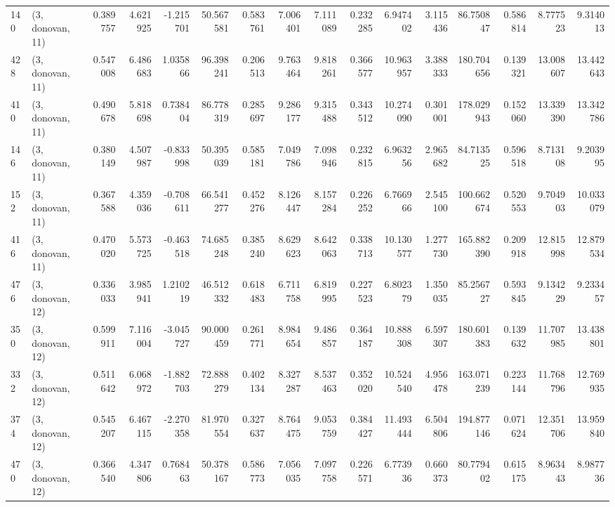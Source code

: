 \begin{tabular}{llrrrrrrrrrrrrrr}
140 &  (3, donovan, 11) &   0.389757 &   4.621925 &  -1.215701 &    50.567581 &   0.583761 &   7.006401 &   7.111089 &  0.232285 &   6.947402 &   3.115436 &    86.750847 &   0.586814 &   8.777523 &   9.314013 \\
428 &  (3, donovan, 11) &   0.547008 &   6.486683 &   1.035866 &    96.398241 &   0.206513 &   9.763464 &   9.818261 &  0.366577 &  10.963957 &   3.388333 &   180.704656 &   0.139321 &  13.008607 &  13.442643 \\
410 &  (3, donovan, 11) &   0.490678 &   5.818698 &   0.738404 &    86.778319 &   0.285697 &   9.286177 &   9.315488 &  0.343512 &  10.274090 &   0.301001 &   178.029943 &   0.152060 &  13.339390 &  13.342786 \\
146 &  (3, donovan, 11) &   0.380149 &   4.507987 &  -0.833998 &    50.395039 &   0.585181 &   7.049786 &   7.098946 &  0.232815 &   6.963256 &   2.965682 &    84.713525 &   0.596518 &   8.713108 &   9.203995 \\
152 &  (3, donovan, 11) &   0.367588 &   4.359036 &  -0.708611 &    66.541277 &   0.452276 &   8.126447 &   8.157284 &  0.226252 &   6.766966 &   2.545100 &   100.662674 &   0.520553 &   9.704903 &  10.033079 \\
416 &  (3, donovan, 11) &   0.470020 &   5.573725 &  -0.463518 &    74.685248 &   0.385240 &   8.629623 &   8.642063 &  0.338713 &  10.130577 &   1.277730 &   165.882390 &   0.209918 &  12.815998 &  12.879534 \\
476 &  (3, donovan, 12) &   0.336033 &   3.985941 &   1.210219 &    46.512332 &   0.618483 &   6.711758 &   6.819995 &  0.227523 &   6.802379 &   1.350035 &    85.256727 &   0.593845 &   9.134229 &   9.233457 \\
350 &  (3, donovan, 12) &   0.599911 &   7.116004 &  -3.045727 &    90.000459 &   0.261771 &   8.984654 &   9.486857 &  0.364187 &  10.888308 &   6.597307 &   180.601383 &   0.139632 &  11.707985 &  13.438801 \\
332 &  (3, donovan, 12) &   0.511642 &   6.068972 &  -1.882703 &    72.888279 &   0.402134 &   8.327287 &   8.537463 &  0.352020 &  10.524540 &   4.956478 &   163.071239 &   0.223144 &  11.768796 &  12.769935 \\
374 &  (3, donovan, 12) &   0.545207 &   6.467115 &  -2.270358 &    81.970554 &   0.327637 &   8.764475 &   9.053759 &  0.384427 &  11.493444 &   6.504806 &   194.877146 &   0.071624 &  12.351706 &  13.959840 \\
470 &  (3, donovan, 12) &   0.366540 &   4.347806 &   0.768463 &    50.378167 &   0.586773 &   7.056035 &   7.097758 &  0.226571 &   6.773936 &   0.660373 &    80.779402 &   0.615175 &   8.963443 &   8.987736 \\

\end{tabular}
